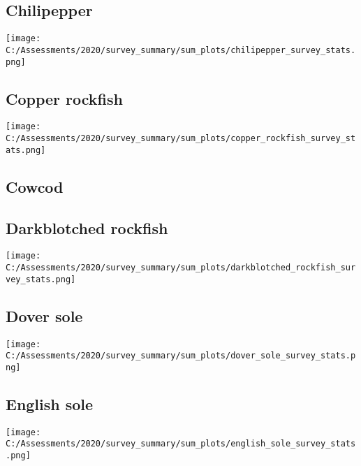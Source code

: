 \documentclass[12pt,]{article}
\begin{document}
\hypertarget{chilipepper}{%
\subsection{Chilipepper}\label{chilipepper}}

\texttt{[image: C:/Assessments/2020/survey\_summary/sum\_plots/chilipepper\_survey\_stats.png]}
\FloatBarrier  

\hypertarget{copper-rockfish}{%
\subsection{Copper rockfish}\label{copper-rockfish}}

\texttt{[image: C:/Assessments/2020/survey\_summary/sum\_plots/copper\_rockfish\_survey\_stats.png]}
\FloatBarrier  

\hypertarget{cowcod}{%
\subsection{Cowcod}\label{cowcod}}

\FloatBarrier

\hypertarget{darkblotched-rockfish}{%
\subsection{Darkblotched rockfish}\label{darkblotched-rockfish}}

\texttt{[image: C:/Assessments/2020/survey\_summary/sum\_plots/darkblotched\_rockfish\_survey\_stats.png]}
\FloatBarrier  

\hypertarget{dover-sole}{%
\subsection{Dover sole}\label{dover-sole}}

\texttt{[image: C:/Assessments/2020/survey\_summary/sum\_plots/dover\_sole\_survey\_stats.png]}
\FloatBarrier  

\hypertarget{english-sole}{%
\subsection{English sole}\label{english-sole}}

\texttt{[image: C:/Assessments/2020/survey\_summary/sum\_plots/english\_sole\_survey\_stats.png]}
\FloatBarrier  
\end{document}

